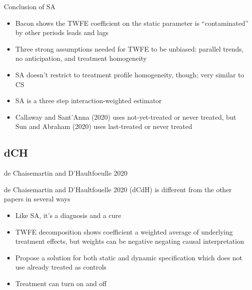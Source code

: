 \documentclass{beamer}
\begin{document}
\begin{frame}{Conclusion of SA}

\begin{itemize}
\item Bacon shows the TWFE coefficient on the static parameter is ``contaminated'' by other periods leads and lags
\item Three strong assumptions needed for TWFE to be unbiased: parallel trends, no anticipation, and treatment homogeneity
\item SA doesn't restrict to treatment profile homogeneity, though; very similar to CS
\item SA is a three step interaction-weighted estimator 
\item Callaway and Sant'Anna (2020) uses not-yet-treated or never treated, but Sun and Abraham (2020) uses last-treated or never treated
\end{itemize}

\end{frame}



\subsection{dCH}

\begin{frame}{de Chaisemartin and D'Haultfoeulle 2020}

de Chaisemartin and D'Haultfouelle 2020 (dCdH) is different from the other papers in several ways
	\begin{itemize}
	\item Like SA, it's a diagnosis and a cure
	\item TWFE decomposition shows coefficient a weighted average of underlying treatment effects, but weights can be negative negating causal interpretation
	\item Propose a solution for both static and dynamic specification which does not use already treated as controls
	\item Treatment can turn on and off
	\end{itemize}

\end{frame}
\end{document}
